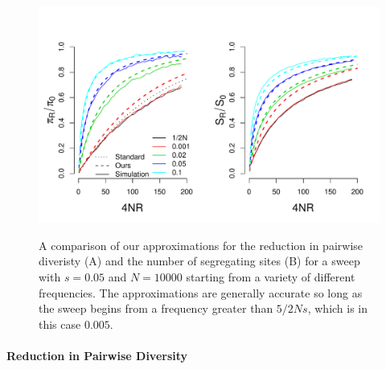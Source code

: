 \documentclass[a4paper,10pt]{article}
\begin{document}
\begin{figure}
	\includegraphics[width = \textwidth]{../Paper_Figures/pi_and_S_density.pdf} \label{pi_plot}
	\caption{A comparison of our approximations for the reduction in pairwise diveristy (A) and the number of segregating sites (B) for a sweep with $s=0.05$ and $N=10000$ starting from a variety of different frequencies. The approximations are generally accurate so long as the sweep begins from a frequency greater than $5/2Ns$, which is in this case $0.005$.}
\end{figure}


\paragraph{Reduction in Pairwise Diversity}
\end{document}
